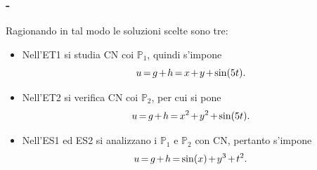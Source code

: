 \documentclass[11pt]{beamer}
\newcommand{\SpaziaturaMate}[3]{
    \setlength{\thinmuskip}{#1mu}
    \setlength{\medmuskip}{#2mu}
    \setlength{\thickmuskip}{#3mu}
}
\begin{document}
            \begin{frame}\frametitle{\titoloSez{} - \insertsubsection{}}
                Ragionando in tal modo le soluzioni scelte sono tre:

                \newcommand{\margineS}{1cm}
                \newcommand{\margineD}{1.75cm}
                \begin{itemize}[label=$\diamond$,
                                topsep=0pt, %
                                itemsep=5pt, %
                                leftmargin=\margineS,%
                                rightmargin=\margineD] %
                    \item Nell'ET1 si studia CN coi $\mathbb P_1$, quindi s'impone
                        \begin{equation*}
                            \SpaziaturaMate{1}{2}{3}
                            u=g+h=x+y+\sin(5t).
                        \end{equation*}
                    \item Nell'ET2 si verifica CN coi $\mathbb P_2$, per cui si pone
                        \begin{equation*}
                            \SpaziaturaMate{1}{2}{3}
                            u=g+h=x^2+y^2+\sin(5t).
                        \end{equation*}
                    \item Nell'ES1 ed ES2 si analizzano i $\mathbb P_1$ e $\mathbb P_2$ con CN, pertanto s'impone
                        \begin{equation*}
                            \SpaziaturaMate{1}{2}{3}
                            u=g+h=\sin(x)+y^3+t^2.
                        \end{equation*}
                \end{itemize}
            \end{frame}
\end{document}
